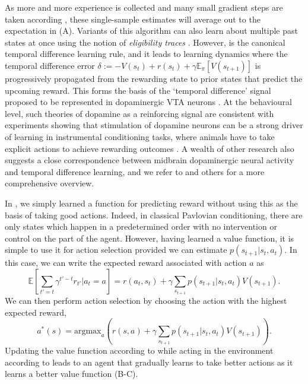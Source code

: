 As more and more experience is collected and many small gradient steps are taken according , these single-sample estimates will average out to the expectation in  (A).
Variants of this algorithm can also learn about multiple past states at once using the notion of \emph{eligibility traces} \citep{sutton2018reinforcement}.
However,  is the canonical temporal difference learning rule, and it leads to learning dynamics where the temporal difference error $\delta := - V(s_t) + r(s_t) + \gamma \mathbb{E}_\pi \left [ V(s_{t+1}) \right ]$ is progressively propagated from the rewarding state to prior states that predict the upcoming reward.
This forms the basis of the `temporal difference' signal proposed to be represented in dopaminergic VTA neurons \citep{schultz1997neural}.
At the behavioural level, such theories of dopamine as a reinforcing signal are consistent with experiments showing that stimulation of dopamine neurons can be a strong driver of learning in instrumental conditioning tasks, where animals have to take explicit actions to achieve rewarding outcomes \citep{olds1954positive, tsai2009phasic}.
A wealth of other research also suggests a close correspondence between midbrain dopaminergic neural activity and temporal difference learning, and we refer to \citet{niv2009reinforcement} and others for a more comprehensive overview.



In , we simply learned a function for predicting reward without using this as the basis of taking good actions.
Indeed, in classical Pavlovian conditioning, there are only states which happen in a predetermined order with no intervention or control on the part of the agent.
However, having learned a value function, it is simple to use it for action selection provided we can estimate $p(s_{t+1} | s_t, a_t)$.
In this case, we can write the expected reward associated with action $a$ as
\begin{equation}
    \mathbb{E} \left [\sum_{t' = t} \gamma^{t'-t} r_{t'} | a_t = a \right ] = r(a_t, s_t) + \gamma \sum_{s_{t+1}} p(s_{t+1} | s_t, a_t) V(s_{t+1}).
\end{equation}
We can then perform action selection by choosing the action with the highest expected reward,
\begin{equation}
    \label{eq:value_action_selection}
    a^*(s) = \text{argmax}_{a} \left ( r(s, a) + \gamma \sum_{s_{t+1}} p(s_{t+1} | s_t, a_t) V(s_{t+1}) \right ).
\end{equation}
Updating the value function according to  while acting in the environment according to  leads to an agent that gradually learns to take better actions as it learns a better value function (B-C).

